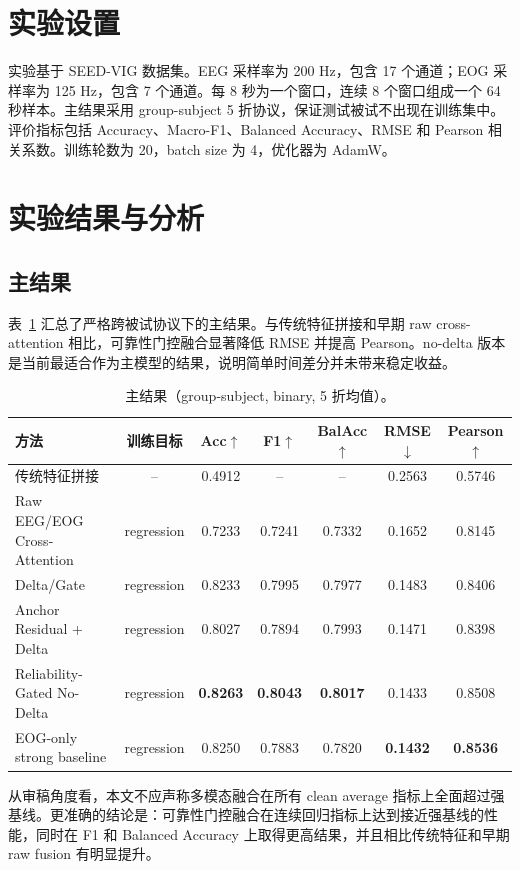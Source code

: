 \documentclass[UTF8,a4paper,11pt,fontset=windows]{ctexart}
\begin{document}
\section{实验设置}
实验基于 SEED-VIG 数据集。EEG 采样率为 200 Hz，包含 17 个通道；EOG 采样率为 125 Hz，包含 7 个通道。每 8 秒为一个窗口，连续 8 个窗口组成一个 64 秒样本。主结果采用 group-subject 5 折协议，保证测试被试不出现在训练集中。评价指标包括 Accuracy、Macro-F1、Balanced Accuracy、RMSE 和 Pearson 相关系数。训练轮数为 20，batch size 为 4，优化器为 AdamW。

\section{实验结果与分析}
\subsection{主结果}
表~\ref{tab:main} 汇总了严格跨被试协议下的主结果。与传统特征拼接和早期 raw cross-attention 相比，可靠性门控融合显著降低 RMSE 并提高 Pearson。no-delta 版本是当前最适合作为主模型的结果，说明简单时间差分并未带来稳定收益。

\begin{table}[H]
\centering
\caption{主结果（group-subject, binary, 5 折均值）。}
\label{tab:main}
\small
\begin{tabular}{lcccccc}
\toprule
方法 & 训练目标 & Acc$\uparrow$ & F1$\uparrow$ & BalAcc$\uparrow$ & RMSE$\downarrow$ & Pearson$\uparrow$ \\
\midrule
传统特征拼接 & -- & 0.4912 & -- & -- & 0.2563 & 0.5746 \\
Raw EEG/EOG Cross-Attention & regression & 0.7233 & 0.7241 & 0.7332 & 0.1652 & 0.8145 \\
Delta/Gate & regression & 0.8233 & 0.7995 & 0.7977 & 0.1483 & 0.8406 \\
Anchor Residual + Delta & regression & 0.8027 & 0.7894 & 0.7993 & 0.1471 & 0.8398 \\
Reliability-Gated No-Delta & regression & \textbf{0.8263} & \textbf{0.8043} & \textbf{0.8017} & 0.1433 & 0.8508 \\
EOG-only strong baseline & regression & 0.8250 & 0.7883 & 0.7820 & \textbf{0.1432} & \textbf{0.8536} \\
\bottomrule
\end{tabular}
\end{table}

从审稿角度看，本文不应声称多模态融合在所有 clean average 指标上全面超过强基线。更准确的结论是：可靠性门控融合在连续回归指标上达到接近强基线的性能，同时在 F1 和 Balanced Accuracy 上取得更高结果，并且相比传统特征和早期 raw fusion 有明显提升。
\end{document}
